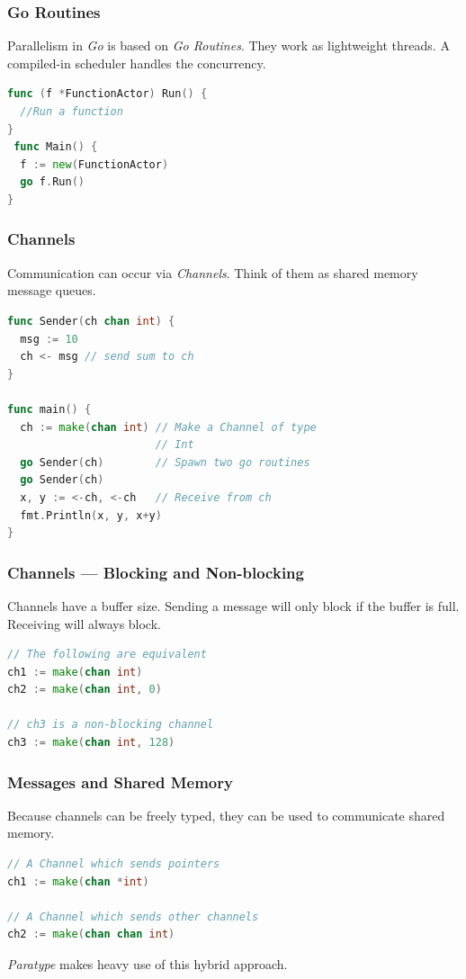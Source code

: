 \documentclass{beamer}
\begin{document}
\begin{frame}[fragile]
  \frametitle{Go Routines}

  Parallelism in \emph{Go} is based on \emph{Go Routines}. They work
  as lightweight threads. A compiled-in scheduler handles the
  concurrency.

  \begin{lstlisting}[language=Go]
func (f *FunctionActor) Run() {
  //Run a function
}
 func Main() {
  f := new(FunctionActor)
  go f.Run()
}
  \end{lstlisting}
\end{frame}

\begin{frame}[fragile]
  \frametitle{Channels}
  
  Communication can occur via \emph{Channels}. Think of them as shared
  memory message queues.

  \begin{lstlisting}[language=Go]
func Sender(ch chan int) {
  msg := 10 
  ch <- msg // send sum to ch
}

func main() {
  ch := make(chan int) // Make a Channel of type 
                       // Int
  go Sender(ch)        // Spawn two go routines
  go Sender(ch)
  x, y := <-ch, <-ch   // Receive from ch
  fmt.Println(x, y, x+y)
}
  \end{lstlisting}
\end{frame}

\begin{frame}[fragile]
  \frametitle{Channels --- Blocking and Non-blocking}

  Channels have a buffer size. Sending a message will only block if
  the buffer is full. Receiving will always block.
  \begin{lstlisting}[language=Go]
// The following are equivalent
ch1 := make(chan int)
ch2 := make(chan int, 0)

// ch3 is a non-blocking channel
ch3 := make(chan int, 128)
  \end{lstlisting}
\end{frame}

\begin{frame}[fragile]
  \frametitle{Messages and Shared Memory}

  Because channels can be freely typed, they can be used to
  communicate shared memory.

  \begin{lstlisting}[language=Go]
// A Channel which sends pointers
ch1 := make(chan *int)

// A Channel which sends other channels
ch2 := make(chan chan int)
  \end{lstlisting}

\vspace{2em}
\emph{Paratype} makes heavy use of this hybrid approach.
\end{frame}
\end{document}
